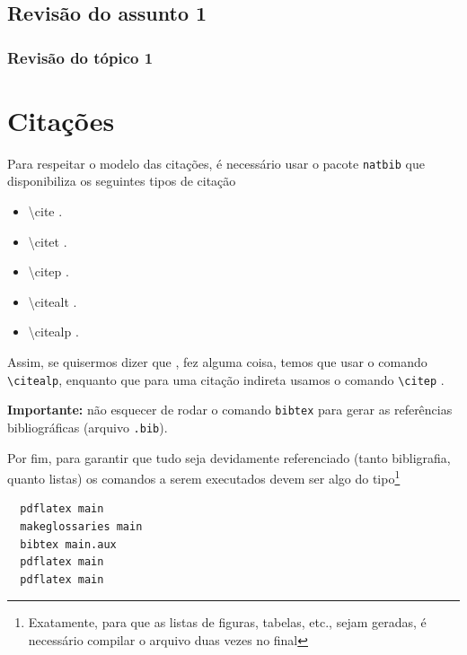 \documentclass{automatex}
\begin{document}
\lipsum[10]

\subsection{Revisão do assunto 1}

\lipsum[11]

\subsubsection{Revisão do tópico 1}

\lipsum[12]

\section{Citações}

Para respeitar o modelo das citações, é necessário usar o pacote {\tt natbib} que disponibiliza
os seguintes tipos de citação
\begin{itemize}
  \item \textbackslash{cite} \cite{small}.
  \item \textbackslash{citet} \citet{small}.
  \item \textbackslash{citep} \citep{small}.
  \item \textbackslash{citealt} \citealt{small}.
  \item \textbackslash{citealp} \citealp{small}.
\end{itemize}

Assim, se quisermos dizer que \citealp{big}, fez alguma coisa, temos que usar o comando {\tt \textbackslash{citealp}},
enquanto que para uma citação indireta usamos o comando {\tt \textbackslash{citep}} \citep{big}.

\textbf{Importante:} não esquecer de rodar o comando \verb+bibtex+ para gerar as referências bibliográficas (arquivo \verb+.bib+).

Por fim, para garantir que tudo seja devidamente referenciado (tanto bibligrafia, quanto listas) os comandos a serem executados devem ser algo do tipo\footnote{Exatamente, para que as listas de figuras, tabelas, etc., sejam geradas, é necessário compilar o arquivo duas vezes no final}
\begin{verbatim}
  pdflatex main
  makeglossaries main
  bibtex main.aux
  pdflatex main
  pdflatex main
\end{verbatim}


\end{document}
